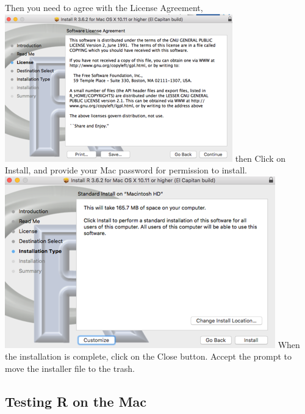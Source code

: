 \documentclass[
]{book}
\begin{document}
Then you need to agree with the License Agreement,
\includegraphics{images/installrmacLicense.png}
then Click on Install, and provide your Mac password for permission to install.
\includegraphics{images/installrmac-install.png}
When the installation is complete, click on the Close button. Accept the prompt to move the installer file to the trash.

\hypertarget{testing-r-on-the-mac}{%
\subsection{Testing R on the Mac}\label{testing-r-on-the-mac}}
\end{document}
